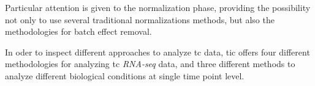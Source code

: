 Particular attention is given to the normalization phase, providing the possibility not only to use several traditional normalizations methods, but also the methodologies for batch effect removal.

In oder to inspect different approaches to analyze \gls{tc} data, \gls{tic} offers four different methodologies for analyzing \gls{tc} \textit{RNA-seq} data, and three different methods to analyze different biological conditions at single time point level.

